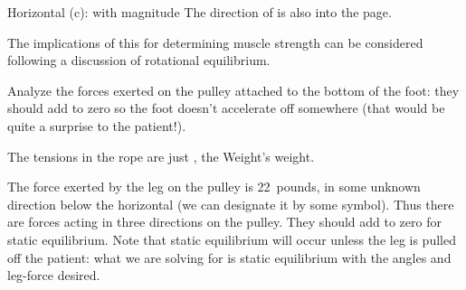{{ Horizontal (c):
%
%
with magnitude
%
%
The direction of  is also into the page.

The implications of this for determining muscle strength can be considered
following a discussion of rotational equilibrium.
%
}%

{Analyze the forces exerted on the pulley attached to the bottom of the foot:
 they should add to zero so the foot doesn't accelerate off somewhere
 (that would be quite a surprise to the patient!).

 The tensions in the rope are just , the Weight's weight.

 The force exerted by the leg on the pulley is 22~pounds, in some unknown
 direction below the horizontal (we can designate it by some symbol).
 Thus there are forces acting in three directions on the pulley.
 They should add to zero for static equilibrium.
 Note that static equilibrium will occur unless the leg is pulled off the
 patient: what we are solving for is static equilibrium with the angles and
 leg-force desired.
}
}%